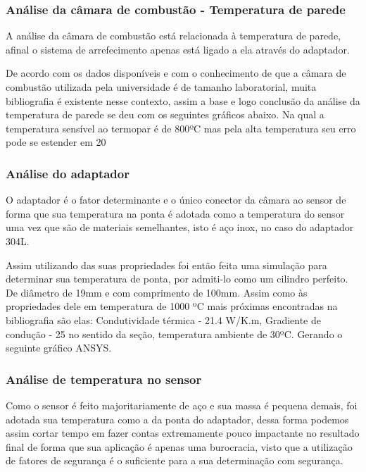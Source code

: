 \subsubsection{Análise da câmara de combustão - Temperatura de parede}

A análise da câmara de combustão está relacionada à temperatura de parede, afinal o sistema de arrefecimento apenas está ligado a ela através do adaptador. 

De acordo com os dados disponíveis e com o conhecimento de que a câmara de combustão utilizada pela universidade é de tamanho laboratorial, muita bibliografia é existente nesse contexto, assim a base e logo conclusão da análise da temperatura de parede se deu com os seguintes gráficos abaixo. Na qual a temperatura sensível ao termopar é de 800ºC mas pela alta temperatura seu erro pode se estender em 20%

\subsubsection{Análise do adaptador}
O adaptador é o fator determinante e o único conector da câmara ao sensor de forma que sua temperatura na ponta é adotada como a temperatura do sensor uma vez que são de materiais semelhantes, isto é aço inox, no caso do adaptador 304L.

Assim utilizando das suas propriedades foi então feita uma simulação para determinar sua temperatura de ponta, por admiti-lo como um cilindro perfeito. De diâmetro de 19mm e com comprimento de 100mm. Assim como às propriedades dele em temperatura de 1000 ºC mais próximas encontradas na bibliografia são elas: Condutividade térmica - 21.4 W/K.m, Gradiente de condução - 25 no sentido da seção, temperatura ambiente de 30ºC. Gerando o seguinte gráfico ANSYS.

\subsubsection{Análise de temperatura no sensor}
Como o sensor é feito majoritariamente de aço e sua massa é pequena demais, foi adotada sua temperatura como a da ponta do adaptador, dessa forma podemos assim cortar tempo em fazer contas extremamente pouco impactante no resultado final de forma que sua aplicação é apenas uma burocracia, visto que a utilização de fatores de segurança é o suficiente para a sua determinação com segurança.

